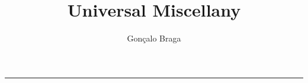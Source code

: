 \documentclass[12pt, letterpaper]{article}
\title{Universal Miscellany}
\author{Gonçalo Braga}
\date{}
\begin{document}
\maketitle
\paragraph*{}
\hrule
\end{document}
